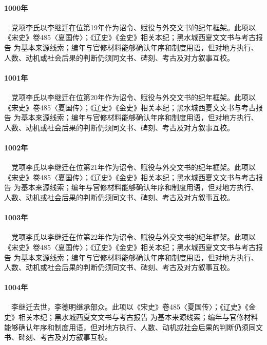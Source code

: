 \paragraph{1000年}　党项李氏以李继迁在位第19年作为诏令、赋役与外交文书的纪年框架。此项以《宋史》卷485〈夏国传〉；《辽史》《金史》相关本纪；黑水城西夏文文书与考古报告 为基本来源线索；编年与官修材料能够确认年序和制度用语，但对地方执行、人数、动机或社会后果的判断仍须同文书、碑刻、考古及对方叙事互校。

\paragraph{1001年}　党项李氏以李继迁在位第20年作为诏令、赋役与外交文书的纪年框架。此项以《宋史》卷485〈夏国传〉；《辽史》《金史》相关本纪；黑水城西夏文文书与考古报告 为基本来源线索；编年与官修材料能够确认年序和制度用语，但对地方执行、人数、动机或社会后果的判断仍须同文书、碑刻、考古及对方叙事互校。

\paragraph{1002年}　党项李氏以李继迁在位第21年作为诏令、赋役与外交文书的纪年框架。此项以《宋史》卷485〈夏国传〉；《辽史》《金史》相关本纪；黑水城西夏文文书与考古报告 为基本来源线索；编年与官修材料能够确认年序和制度用语，但对地方执行、人数、动机或社会后果的判断仍须同文书、碑刻、考古及对方叙事互校。

\paragraph{1003年}　党项李氏以李继迁在位第22年作为诏令、赋役与外交文书的纪年框架。此项以《宋史》卷485〈夏国传〉；《辽史》《金史》相关本纪；黑水城西夏文文书与考古报告 为基本来源线索；编年与官修材料能够确认年序和制度用语，但对地方执行、人数、动机或社会后果的判断仍须同文书、碑刻、考古及对方叙事互校。

\paragraph{1004年}　李继迁去世，李德明继承部众。此项以《宋史》卷485〈夏国传〉；《辽史》《金史》相关本纪；黑水城西夏文文书与考古报告 为基本来源线索；编年与官修材料能够确认年序和制度用语，但对地方执行、人数、动机或社会后果的判断仍须同文书、碑刻、考古及对方叙事互校。

